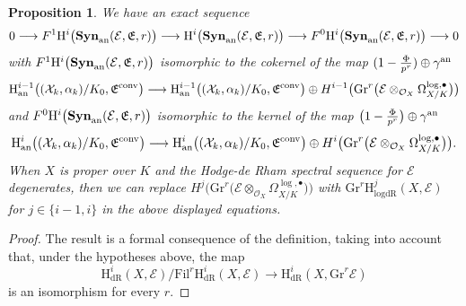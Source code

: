 \documentclass[asterisque,english]{smfart}
\newtheorem{proposition}[theo]{Proposition}
\begin{document}
\begin{proposition} \label{prop:spectralanal}
We have an exact sequence
$$ 0\longrightarrow F^1\mathrm{H}^i\bigl(\mathbf{Syn}_{\rm an}(\mathcal{E},\mathfrak{E},r)\bigr) \longrightarrow  \mathrm{H}^i\bigl(\mathbf{Syn}_{\rm an}(\mathcal{E},\mathfrak{E},r)\bigr) \longrightarrow  F^0 \mathrm{H}^i\bigl(\mathbf{Syn}_{\rm an}(\mathcal{E},\mathfrak{E},r)\bigr) \longrightarrow 0$$with $ F^1\mathrm{H}^i\bigl(\mathbf{Syn}_{\rm an}(\mathcal{E},\mathfrak{E},r)\bigr)$ isomorphic to the cokernel of the map $(1-\frac{\Phi}{p^r})  \oplus \gamma^{\rm an}$ $$\mathrm{H}^{i-1}_{\mathrm{an}}\bigl((\mathcal{X}_k,\alpha_k)/K_0,\mathfrak{E}^{\rm conv}\bigr) \longrightarrow \mathrm{H}^{i-1}_{\mathrm{an}}\bigl((\mathcal{X}_k,\alpha_k)/K_0,\mathfrak{E}^{\rm conv}\bigr) \oplus H^{i-1}\bigl(\mathrm{Gr}^r \bigl(\mathcal{E} \otimes_{\mathcal{O}_X}  \Omega_{X/K}^{\log,\bullet}\bigr)\bigr)  $$and $F^0 \mathrm{H}^i\bigl(\mathbf{Syn}_{\rm an}(\mathcal{E},\mathfrak{E},r)\bigr)$ isomorphic to the kernel of the map   $\bigl(1-\frac{\Phi}{p^r}\bigr) \oplus \gamma^{\rm an}$ $$\mathrm{H}^i_{\mathrm{an}}\bigl((\mathcal{X}_k,\alpha_k)/K_0,\mathfrak{E}^{\rm conv}\bigr) \longrightarrow \mathrm{H}^i_{\mathrm{an}}\bigl((\mathcal{X}_k,\alpha_k)/K_0,\mathfrak{E}^{\rm conv}\bigr) \oplus H^{i}\bigl(\mathrm{Gr}^r \bigl(\mathcal{E} \otimes_{\mathcal{O}_X}  \Omega_{X/K}^{\log,\bullet}\bigr)\bigr).$$
When $X$ is proper over $K$ and the Hodge-de Rham spectral sequence for $\mathcal{E}$ degenerates, then we can replace $H^{j}\bigl(\mathrm{Gr}^r \bigl(\mathcal{E} \otimes_{\mathcal{O}_X}  \Omega_{X/K}^{\log,\bullet}\bigr)\bigr)$ with $\mathrm{Gr}^r \mathrm{H}^{j}_{\mathrm{logdR}}(X,\mathcal{E})$ for $j \in \{i-1,i\}$ in the above displayed equations.

\end{proposition}
\begin{proof} The result is a formal consequence of the definition, taking into account that, under the hypotheses above, the map  $$\mathrm{H}^i_{\mathrm{dR}}(X,\mathcal{E})/ \mathrm{Fil}^r \mathrm{H}^i_{\mathrm{dR}}(X,\mathcal{E}) \to \mathrm{H}^i_{\mathrm{dR}}(X,\mathrm{Gr}^r \mathcal{E}) $$ is an isomorphism for every $r$.
\end{proof}
\end{document}
